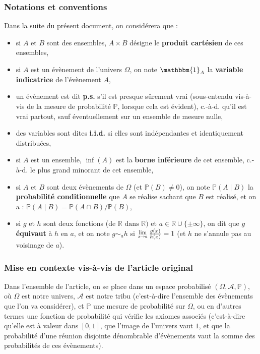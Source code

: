 \documentclass[12pt,a4paper]{article}
\newcommand{\Lim}[1]{\raisebox{0.5ex}{\scalebox{0.8}{$\displaystyle \lim_{#1}\;$}}}
\begin{document}
\subsubsection{Notations et conventions}
Dans la suite du présent document, on considérera que :
\begin{itemize}
    \item si $A$ et $B$ sont des ensembles, $A \times B$ désigne le \textbf{produit cartésien} de ces ensembles,
    
    \item si $A$ est un évènement de l'univers $\Omega$, on note $\mathbbm{1}_A$ la \textbf{variable indicatrice} de l'évènement $A$,
    
    \item un évènement est dit \textbf{p.s.} s'il est presque sûrement vrai (sous-entendu vis-à-vis de la mesure de probabilité $\mathbb{P}$, lorsque cela est évident), c.-à-d. qu'il est vrai partout, sauf éventuellement sur un ensemble de mesure nulle,
    
    \item des variables sont dites \textbf{i.i.d.} si elles sont indépendantes et identiquement distribuées,
    
    \item si $A$ est un ensemble, $\inf(A)$ est la \textbf{borne inférieure} de cet ensemble, c.-à-d. le plus grand minorant de cet ensemble, 
    
    \item si $A$ et $B$ sont deux évènements de $\Omega$ (et $\mathbb{P}(B) \neq 0$), on note $\mathbb{P}(A \mid B)$ la \textbf{probabilité conditionnelle} que $A$ se réalise sachant que $B$ est réalisé, et on a : $\mathbb{P}(A \mid B) = \mathbb{P}(A \cap B) / \mathbb{P}(B)$,
    
    \item si $g$ et $h$ sont deux fonctions (de $\mathbb{R} \text{ dans } \mathbb{R})$ et $a \in \mathbb{R} \cup \{\pm \infty\} $, on dit que $g$ \textbf{équivaut} à $h$ en $a$, et on note $g \sim_{a} h$ si ${\Lim{x \rightarrow a} \frac{g(x)}{h(x)} = 1}$ (et $h$ ne s'annule pas au voisinage de $a$). 
\end{itemize}

\subsubsection{Mise en contexte vis-à-vis de l'article original} 

Dans l'ensemble de l'article, on se place dans un espace probabilisé $(\Omega, \mathcal{A}, \mathbb{P})$, où $\Omega$ est notre univers, $\mathcal{A}$ est notre tribu (c'est-à-dire l'ensemble des évènements que l'on va considérer), et $\mathbb{P}$ une mesure de probabilité sur $\Omega$, ou en d'autres termes une fonction de probabilité qui vérifie les axiomes associés (c'est-à-dire qu'elle est à valeur dans $[0,1]$, que l'image de l'univers vaut $1$, et que la probabilité d'une réunion disjointe dénombrable d'évènements vaut la somme des probabilités de ces évènements).
\end{document}

